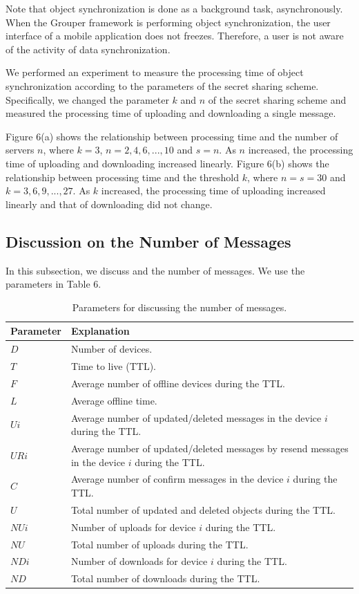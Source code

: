 \documentclass[sigconf]{acmart}
\begin{document}
Note that object synchronization is done as a background task, asynchronously.
When the Grouper framework is performing object synchronization, the user interface of a mobile application does not freezes.
Therefore, a user is not aware of the activity of data synchronization.

We performed an experiment to measure the processing time of object synchronization according to the parameters of the secret sharing scheme.
Specifically, we changed the parameter ${k}$ and ${n}$ of the secret sharing scheme and measured the processing time of uploading and downloading a single message.

Figure 6(a) shows the relationship between processing time and the number of servers ${n}$, where ${k=3}$,  ${n = 2, 4, 6, ... , 10}$ and $s = n$.
As $n$ increased, the processing time of uploading and downloading increased linearly. 
Figure 6(b) shows the relationship between processing time and the threshold ${k}$, where ${n = s =30}$ and ${k = 3, 6, 9, ... , 27}$.
As $k$ increased, the processing time of uploading increased linearly and that of downloading did not change.

\subsection{Discussion on the Number of Messages}

In this subsection, we discuss and the number of messages. 
We use the parameters in Table 6.

\begin{table}[t]
	\centering
	\small
	\caption{Parameters for discussing the number of messages.}
	\begin{tabular}{ll}
		\hline
		\textbf{Parameter} & \textbf{Explanation} \\ \hline
		$D$ & Number of devices. \\
		$T$ & Time to live (TTL). \\
		$F$ & Average number of offline devices during the TTL. \\
		$L$ & Average offline time. \\
		$Ui$ & Average number of updated/deleted messages in the device $i$ during the TTL. \\ 
		$URi$ & Average number of updated/deleted messages by resend messages in the device $i$ during the TTL.\\ 
		$C$ & Average number of confirm messages in the device $i$ during the TTL. \\ 
		$U$ & Total number of updated and deleted objects during the TTL. \\ 
		$NUi$ & Number of uploads for device $i$ during the TTL. \\
		$NU$ & Total number of uploads during the TTL. \\
		$NDi$ & Number of downloads for device $i$ during the TTL. \\
		$ND$ & Total number of downloads during the TTL. \\ \hline
	\end{tabular}
\end{table}
\end{document}
